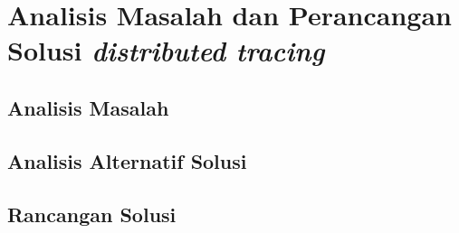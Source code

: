 \chapter{Analisis Masalah dan Perancangan Solusi \textit{distributed tracing}}



\section{Analisis Masalah}


\section{Analisis Alternatif Solusi}

\section{Rancangan Solusi}